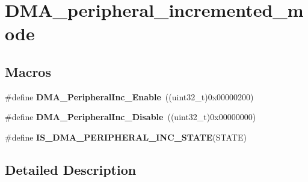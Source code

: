 \hypertarget{group___d_m_a__peripheral__incremented__mode}{\section{D\-M\-A\-\_\-peripheral\-\_\-incremented\-\_\-mode}
\label{group___d_m_a__peripheral__incremented__mode}
}
\subsection*{Macros}
\begin{DoxyCompactItemize}
\item 
\hypertarget{group___d_m_a__peripheral__incremented__mode_gaf7921ea423fb60701a091c508cd0f33a}{\#define {\bfseries D\-M\-A\-\_\-\-Peripheral\-Inc\-\_\-\-Enable}~((uint32\-\_\-t)0x00000200)}\label{group___d_m_a__peripheral__incremented__mode_gaf7921ea423fb60701a091c508cd0f33a}

\item 
\hypertarget{group___d_m_a__peripheral__incremented__mode_ga0fe3ff9c67bec802dd239fd17c3dbd31}{\#define {\bfseries D\-M\-A\-\_\-\-Peripheral\-Inc\-\_\-\-Disable}~((uint32\-\_\-t)0x00000000)}\label{group___d_m_a__peripheral__incremented__mode_ga0fe3ff9c67bec802dd239fd17c3dbd31}

\item 
\#define {\bfseries I\-S\-\_\-\-D\-M\-A\-\_\-\-P\-E\-R\-I\-P\-H\-E\-R\-A\-L\-\_\-\-I\-N\-C\-\_\-\-S\-T\-A\-T\-E}(S\-T\-A\-T\-E)
\end{DoxyCompactItemize}


\subsection{Detailed Description}


